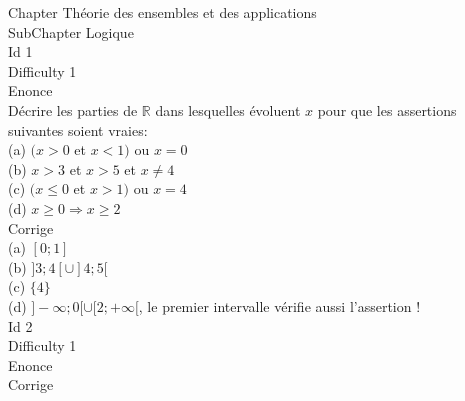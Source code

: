 \documentclass[12pt]{article}
\begin{document}
Chapter Théorie des ensembles et des applications\\
SubChapter Logique\\
Id 1\\
Difficulty 1\\
Enonce\\
Décrire les parties de $\mathbb{R}$ dans lesquelles évoluent $x$ pour que les assertions suivantes soient vraies:\\
(a) $(x>0$ et $x<1)$ ou $x=0$\\
(b) $x>3$ et $x>5$ et $x \neq 4$\\
(c) $(x \leq 0$ et $x>1)$ ou $x=4$\\
(d) $x \geq 0 \Rightarrow x \geq 2$\\

Corrige\\
(a) $[0;1]$\\
(b) $]3;4[\cup]4;5[$\\
(c) $\{4\}$\\
(d) $]-\infty;0[\cup[2;+\infty[$, le premier intervalle vérifie aussi l'assertion !\\

Id 2\\
Difficulty 1\\
Enonce\\

Corrige\\
\end{document}
